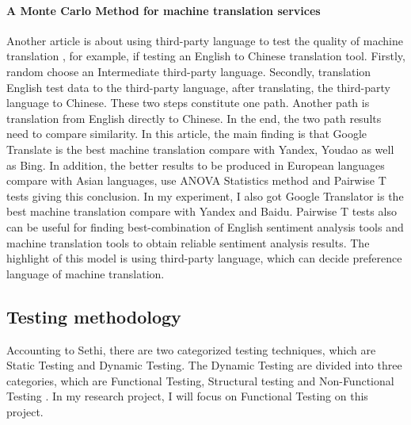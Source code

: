 \documentclass[conference]{IEEEtran}
\begin{document}
\paragraph{A Monte Carlo Method for machine translation services}
Another article is about using third-party language to test the quality of machine
translation \cite{thirdPartMachineTranslation}, for example, if testing an English to Chinese translation tool.
Firstly, random choose an Intermediate third-party language.
Secondly, translation English test data to the third-party language, after
translating, the third-party language to Chinese.
These two steps constitute one path.
Another path is translation from English directly to Chinese.
In the end, the two path results need to compare similarity. In this article, the main
finding is that Google Translate is the best machine translation compare with
Yandex, Youdao as well as Bing. In addition,
the better results to be produced in European languages compare with Asian languages, use ANOVA Statistics
method and Pairwise T tests giving this conclusion.
In my experiment, I also got Google Translator is the best machine translation
compare with Yandex and Baidu. Pairwise T tests also can be useful for finding best-combination of English
sentiment analysis tools and machine translation tools to obtain reliable
sentiment analysis results. The highlight of this model is using third-party
language, which can decide preference language of machine translation.

\subsection{Testing methodology}
Accounting to Sethi, there are two categorized testing
techniques, which are Static Testing and Dynamic Testing. The Dynamic Testing
are divided into three categories, which are Functional Testing, Structural
testing and Non-Functional Testing \cite{testingMethodReview}.
In my research project, I will focus on Functional Testing on this project.
\end{document}
